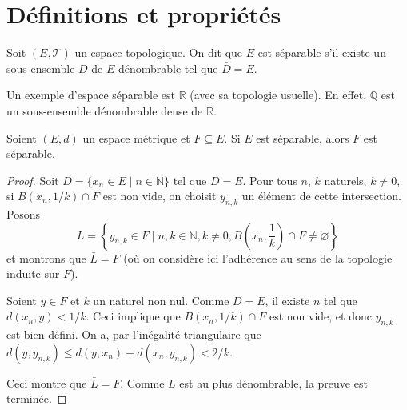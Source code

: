 \section{Définitions et propriétés}
\begin{df}
  Soit $(E, \mathcal T)$ un espace topologique. On dit que $E$ est séparable
  s'il existe un sous-ensemble $D$ de $E$ dénombrable tel que
  $\bar D = E$.
\end{df}

Un exemple d'espace séparable est $\mathbb R$ (avec sa topologie usuelle).
En effet, $\mathbb Q$ est un sous-ensemble dénombrable dense de $\mathbb R$.

\begin{prop}\label{sep:ind}
  Soient $(E, d)$ un espace métrique et $F\subseteq E$. Si $E$ est séparable,
  alors $F$ est séparable.
\end{prop}
\begin{proof}
  Soit $D = \{x_n \in E\mid {n\in\mathbb N}\}$ tel que $\bar D = E$.
  Pour tous $n$, $k$ naturels, $k\neq 0$, si
  $B\left(x_n, 1/k\right)\cap F$ est non
  vide, on choisit $y_{n, k}$ un élément de cette intersection. Posons
  $$L = \left\{y_{n, k} \in F\mid n, k\in\mathbb N, k \neq 0,
    B\left(x_n, \frac{1}{k}\right)\cap F\neq \varnothing\right\}$$
  et montrons que $\bar L = F$ (où on considère ici l'adhérence au sens
  de la topologie induite sur $F$).

  Soient $y\in F$ et $k$ un naturel non nul.
  Comme $\bar D = E$, il existe $n$ tel que $d(x_n, y) < 1/k$. Ceci implique
  que $B(x_n, 1/k)\cap F$ est non vide, et donc  $y_{n, k}$ est bien défini.
  On a, par l'inégalité triangulaire que $d(y, y_{n, k}) \leq d(y, x_n) +
  d(x_n, y_{n, k}) < 2/k$.

  Ceci montre que $\bar L = F$. Comme $L$ est au plus dénombrable,
  la preuve est terminée.
\end{proof}

